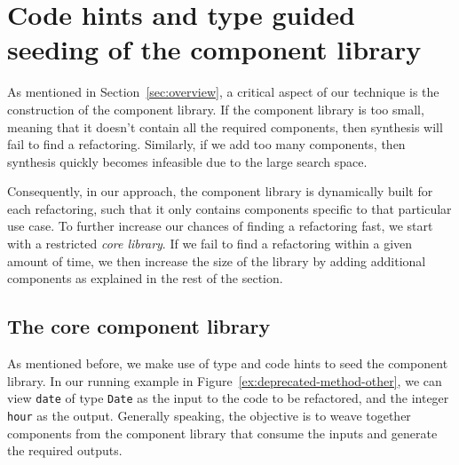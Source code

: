 \documentclass[sigconf,review,anonymous]{acmart}
\begin{document}

\section{{\bf Code hints and type guided seeding of the component library}}\label{sec:components-seeding}
As mentioned in Section~\ref{sec:overview}, a critical aspect of our technique is the construction
of the component library. 
If the component library is too small, meaning that it doesn't contain all
the required components, then synthesis will fail to find a refactoring.
Similarly, if we add too many components, then synthesis quickly becomes infeasible
due to the large search space.

Consequently, in our approach, the component library is dynamically built for each refactoring,
such that it only contains components specific to that particular use case.
To further increase our chances of finding a refactoring fast, we start with a restricted {\em core library}.
If we fail to find a refactoring within a given amount of time, we then increase the size of the library by adding additional components as explained in the rest of the section.


\subsection{The core component library}
As mentioned before, we make use of type and code hints to seed the component library.
In our running example in Figure~\ref{ex:deprecated-method-other}, we can view \texttt{date} of type \texttt{Date} as the input to the code to be refactored, and the integer \texttt{hour} as the output. Generally speaking, the objective is to weave together components from the component library that consume the inputs and generate the required outputs.
\end{document}
